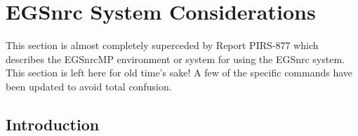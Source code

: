
%
%
%
%
%
%
%
%
%




\section{EGSnrc System Considerations}
\label{sys_consid}

This section is almost completely superceded by Report PIRS-877 which
describes the EGSnrcMP environment or system for using the EGSnrc
system\cite{Ka03}.  This section is left here for old time's sake! A few of
the specific commands have been updated to avoid total confusion.
\subsection{Introduction}

